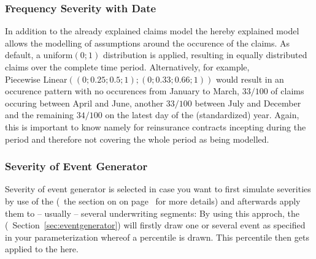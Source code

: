 \subsubsection*{Frequency Severity with Date}

In addition to the already explained claims model  the hereby explained model allows the modelling of assumptions around the occurence of the claims. As default, a uniform$(0;1)$ distribution is applied, resulting in equally distributed claims over the complete time period. Alternatively, for example, \\ Piecewise Linear$((0;0.25;0.5;1);(0;0.33;0.66;1))$ would result in an occurence pattern with no occurences from January to March, $33/100$ of claims occuring between April and June, another $33/100$ between July and December and the remaining $34/100$ on the latest day of the (standardized) year. Again, this is important to know namely for reinsurance contracts incepting during the period and therefore not covering the whole period as being modelled.

\subsubsection*{Severity of Event Generator}
\label{sec:ExternalSeverity}

Severity of event generator is selected in case you want to first simulate severities by use of the  (\cf~the section on  on page~\pageref{sec:eventgenerator} for more details) and afterwards apply them to -- usually -- several underwriting segments: By using this approch, the  (\cf~Section~\ref{sec:eventgenerator}) will firstly draw one or several event as specified in your parameterization whereof a percentile is drawn. This percentile then gets applied to the  here.

